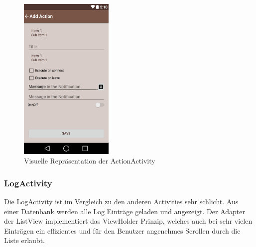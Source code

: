 \begin{figure}[ht]
	\centering
	\includegraphics[width=0.4\textwidth]{images/actionactivity.png}
	\caption{Visuelle Repräsentation der ActionActivity}
	\label{fig:actionctivity}
\end{figure}

\subsubsection{LogActivity}
Die LogActivity ist im Vergleich zu den anderen Activities sehr schlicht. Aus einer Datenbank werden alle Log Einträge geladen und angezeigt. Der Adapter der ListView implementiert das ViewHolder Prinzip, welches auch bei sehr vielen Einträgen ein effizientes und für den Benutzer angenehmes Scrollen durch die Liste erlaubt.


\newpage{}
